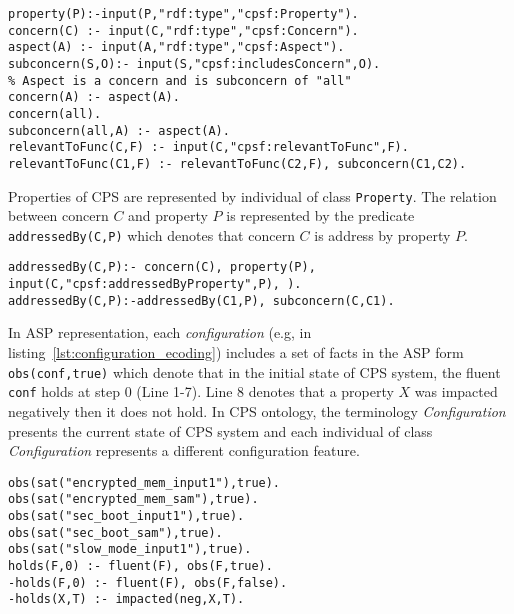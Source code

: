 \begin{lstlisting}[language=clingo,caption=ASP reasoning RDF triplestores in Ontology $\Omega$, label=lst:RDF_triplestore_ecoding, mathescape=true,xleftmargin=.01\textwidth, breaklines=true]
property(P):-input(P,"rdf:type","cpsf:Property").
concern(C) :- input(C,"rdf:type","cpsf:Concern").
aspect(A) :- input(A,"rdf:type","cpsf:Aspect").
subconcern(S,O):- input(S,"cpsf:includesConcern",O).
% Aspect is a concern and is subconcern of "all"
concern(A) :- aspect(A).
concern(all).
subconcern(all,A) :- aspect(A).
relevantToFunc(C,F) :- input(C,"cpsf:relevantToFunc",F).
relevantToFunc(C1,F) :- relevantToFunc(C2,F), subconcern(C1,C2).
\end{lstlisting}
%
Properties of CPS are represented by individual of class {\tt Property}. The relation between concern $C$ and property $P$ is represented by the predicate {\tt \small addressedBy(C,P)} which denotes that concern $C$ is address by property $P$.
\begin{lstlisting}[language=clingo,caption=The relation between Properties and Concerns in $\Omega$, label=lst:address_encoding, mathescape=true,xleftmargin=.01\textwidth, breaklines=true]
addressedBy(C,P):- concern(C), property(P), input(C,"cpsf:addressedByProperty",P), ).
addressedBy(C,P):-addressedBy(C1,P), subconcern(C,C1).
\end{lstlisting}
%  
In ASP representation, each \emph{configuration} (e.g, in listing~\ref{lst:configuration_ecoding}) includes a set of facts in the ASP form {\tt obs(conf,true)} which denote that in the initial state of CPS system, the fluent {\tt conf} holds at step 0 (Line 1-7). Line 8 denotes that a property $X$ was impacted negatively then it does not hold. 
In CPS ontology, the terminology \emph{Configuration} presents the current state of CPS system and each individual of class \emph{Configuration} represents a different configuration feature.
\begin{lstlisting}[language=clingo,caption=ASP reasoning Configurations (Initial State) in $\Omega$, label=lst:configuration_ecoding, mathescape=true,xleftmargin=.01\textwidth, breaklines=true]
obs(sat("encrypted_mem_input1"),true).
obs(sat("encrypted_mem_sam"),true).
obs(sat("sec_boot_input1"),true).
obs(sat("sec_boot_sam"),true).
obs(sat("slow_mode_input1"),true).
holds(F,0) :- fluent(F), obs(F,true).
-holds(F,0) :- fluent(F), obs(F,false).
-holds(X,T) :- impacted(neg,X,T).
\end{lstlisting}

